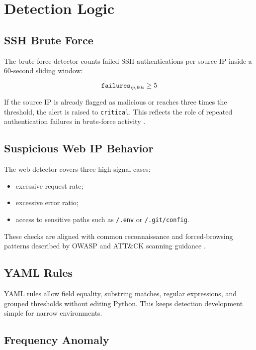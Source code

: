 \documentclass[11pt,a4paper]{article}
\begin{document}
\section{Detection Logic}

\subsection{SSH Brute Force}

The brute-force detector counts failed SSH authentications per source IP inside a 60-second sliding window:

\begin{equation}
\texttt{failures}_{ip,60s} \geq 5
\end{equation}

If the source IP is already flagged as malicious or reaches three times the threshold, the alert is raised to \texttt{critical}. This reflects the role of repeated authentication failures in brute-force activity \citep{mitreT1110}.

\subsection{Suspicious Web IP Behavior}

The web detector covers three high-signal cases:

\begin{itemize}[leftmargin=1.5em]
  \item excessive request rate;
  \item excessive error ratio;
  \item access to sensitive paths such as \texttt{/.env} or \texttt{/.git/config}.
\end{itemize}

These checks are aligned with common reconnaissance and forced-browsing patterns described by OWASP and ATT\&CK scanning guidance \citep{owaspForcedBrowsing,mitreT1595Wordlist}.

\subsection{YAML Rules}

YAML rules allow field equality, substring matches, regular expressions, and grouped thresholds without editing Python. This keeps detection development simple for narrow environments.

\subsection{Frequency Anomaly}
\end{document}
